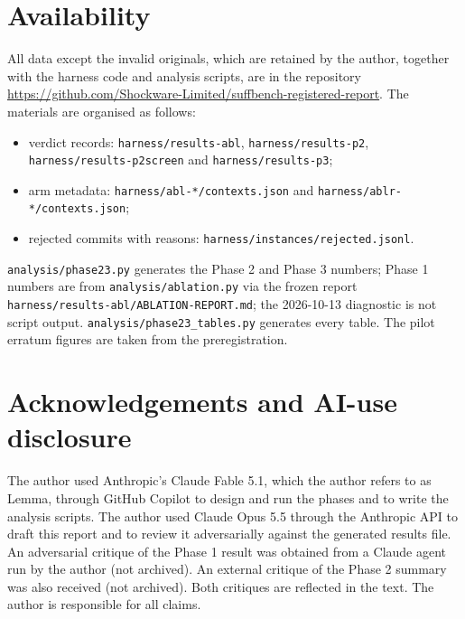 \section{Availability}

All data except the invalid originals, which are retained by the author, together with the harness code and analysis scripts, are in the repository \url{https://github.com/Shockware-Limited/suffbench-registered-report}. The materials are organised as follows:
\begin{itemize}
\item verdict records: \texttt{harness/results-abl}, \texttt{harness/results-p2}, \texttt{harness/results-p2screen} and \texttt{harness/results-p3};
\item arm metadata: \texttt{harness/abl-*/contexts.json} and \texttt{harness/ablr-*/contexts.json};
\item rejected commits with reasons: \texttt{harness/instances/rejected.jsonl}.
\end{itemize}

\texttt{analysis/phase23.py} generates the Phase 2 and Phase 3 numbers; Phase 1 numbers are from \texttt{analysis/ablation.py} via the frozen report \texttt{harness/results-abl/ABLATION-REPORT.md}; the 2026-10-13 diagnostic is not script output. \texttt{analysis/phase23\_tables.py} generates every table. The pilot erratum figures are taken from the preregistration.

\section*{Acknowledgements and AI-use disclosure}

The author used Anthropic's Claude Fable 5.1, which the author refers to as Lemma, through GitHub Copilot to design and run the phases and to write the analysis scripts. The author used Claude Opus 5.5 through the Anthropic API to draft this report and to review it adversarially against the generated results file. An adversarial critique of the Phase 1 result was obtained from a Claude agent run by the author (not archived). An external critique of the Phase 2 summary was also received (not archived). Both critiques are reflected in the text. The author is responsible for all claims.

